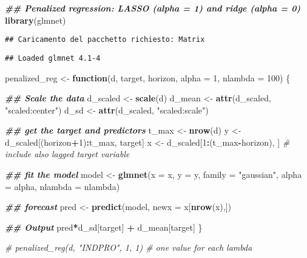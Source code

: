\documentclass[
]{book}
\newenvironment{Shaded}{\begin{snugshade}}{\end{snugshade}}
\newcommand{\AttributeTok}[1]{\textcolor[rgb]{0.13,0.29,0.53}{#1}}
\newcommand{\CommentTok}[1]{\textcolor[rgb]{0.56,0.35,0.01}{\textit{#1}}}
\newcommand{\ControlFlowTok}[1]{\textcolor[rgb]{0.13,0.29,0.53}{\textbf{#1}}}
\newcommand{\DecValTok}[1]{\textcolor[rgb]{0.00,0.00,0.81}{#1}}
\newcommand{\DocumentationTok}[1]{\textcolor[rgb]{0.56,0.35,0.01}{\textbf{\textit{#1}}}}
\newcommand{\FunctionTok}[1]{\textcolor[rgb]{0.13,0.29,0.53}{\textbf{#1}}}
\newcommand{\NormalTok}[1]{#1}
\newcommand{\OtherTok}[1]{\textcolor[rgb]{0.56,0.35,0.01}{#1}}
\newcommand{\SpecialCharTok}[1]{\textcolor[rgb]{0.81,0.36,0.00}{\textbf{#1}}}
\newcommand{\StringTok}[1]{\textcolor[rgb]{0.31,0.60,0.02}{#1}}
\begin{document}
\begin{Shaded}
\begin{Highlighting}[]
\DocumentationTok{\#\# Penalized regression: LASSO (alpha = 1) and ridge (alpha = 0)}
\FunctionTok{library}\NormalTok{(glmnet)}
\end{Highlighting}
\end{Shaded}

\begin{verbatim}
## Caricamento del pacchetto richiesto: Matrix
\end{verbatim}

\begin{verbatim}
## Loaded glmnet 4.1-4
\end{verbatim}

\begin{Shaded}
\begin{Highlighting}[]
\NormalTok{penalized\_reg }\OtherTok{\textless{}{-}} \ControlFlowTok{function}\NormalTok{(d, target, horizon, }\AttributeTok{alpha =} \DecValTok{1}\NormalTok{, }\AttributeTok{nlambda =} \DecValTok{100}\NormalTok{) \{}
  
  \DocumentationTok{\#\# Scale the data}
\NormalTok{  d\_scaled }\OtherTok{\textless{}{-}} \FunctionTok{scale}\NormalTok{(d)}
\NormalTok{  d\_mean }\OtherTok{\textless{}{-}} \FunctionTok{attr}\NormalTok{(d\_scaled, }\StringTok{"scaled:center"}\NormalTok{)}
\NormalTok{  d\_sd }\OtherTok{\textless{}{-}} \FunctionTok{attr}\NormalTok{(d\_scaled, }\StringTok{"scaled:scale"}\NormalTok{)}
  
  \DocumentationTok{\#\# get the target and predictors}
\NormalTok{  t\_max }\OtherTok{\textless{}{-}} \FunctionTok{nrow}\NormalTok{(d)}
\NormalTok{  y }\OtherTok{\textless{}{-}}\NormalTok{ d\_scaled[(horizon}\SpecialCharTok{+}\DecValTok{1}\NormalTok{)}\SpecialCharTok{:}\NormalTok{t\_max, target]   }
\NormalTok{  x }\OtherTok{\textless{}{-}}\NormalTok{ d\_scaled[}\DecValTok{1}\SpecialCharTok{:}\NormalTok{(t\_max}\SpecialCharTok{{-}}\NormalTok{horizon), ] }\CommentTok{\# include also lagged target variable}
  
  \DocumentationTok{\#\# fit the model}
\NormalTok{  model }\OtherTok{\textless{}{-}} \FunctionTok{glmnet}\NormalTok{(}\AttributeTok{x =}\NormalTok{ x, }\AttributeTok{y =}\NormalTok{ y, }\AttributeTok{family =} \StringTok{"gaussian"}\NormalTok{, }
                  \AttributeTok{alpha =}\NormalTok{ alpha, }\AttributeTok{nlambda =}\NormalTok{ nlambda)}
  
  \DocumentationTok{\#\# forecast}
\NormalTok{  pred }\OtherTok{\textless{}{-}} \FunctionTok{predict}\NormalTok{(model, }\AttributeTok{newx =}\NormalTok{ x[}\FunctionTok{nrow}\NormalTok{(x),])}
  
  \DocumentationTok{\#\# Output}
\NormalTok{  pred}\SpecialCharTok{*}\NormalTok{d\_sd[target] }\SpecialCharTok{+}\NormalTok{ d\_mean[target]}
\NormalTok{\}}

\CommentTok{\# penalized\_reg(d, "INDPRO", 1, 1) \# one value for each lambda}
\end{Highlighting}
\end{Shaded}
\end{document}
